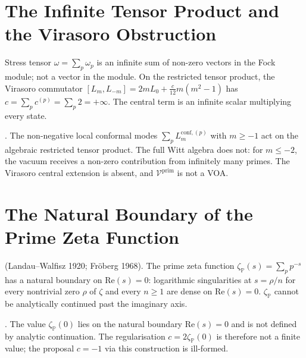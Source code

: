 \section{The Infinite Tensor Product and the Virasoro Obstruction}
\label{v4-arith:pol:infinite-tensor-not-VOA}

\begin{observation}
\label{v4-arith:obs:infinite-tensor-fails}
Stress tensor \(\omega=\sum_{p}\omega_{p}\) is an infinite sum of
non-zero vectors in the Fock module; not a vector in the module.
On the restricted tensor product, the Virasoro commutator
\([L_{m},L_{-m}]=2m L_{0}+\tfrac{c}{12}m(m^{2}-1)\) has
\(c=\sum_{p}c^{(p)}=\sum_{p}2=+\infty\). The central term is an
infinite scalar multiplying every state.
\end{observation}

\begin{corollary}
\label{v4-arith:cor:no-virasoro}
\ClaimStatusProvedHere. The non-negative local conformal modes
\(\sum_{p}L_{m}^{\mathrm{conf},(p)}\) with \(m\geq -1\) act on the
algebraic restricted tensor product. The full Witt algebra does not:
for \(m\leq -2\), the vacuum receives a non-zero contribution from
infinitely many primes. The Virasoro central extension is absent, and
\(\mathcal{V}^{\mathrm{prim}}\) is not a VOA.
\end{corollary}

\section{The Natural Boundary of the Prime Zeta Function}
\label{v4-arith:pol:prime-zeta-obstruction}

\begin{theorem}
\label{v4-arith:thm:prime-zeta-natural-boundary}
\ClaimStatusProvedElsewhere (Landau--Walfisz 1920; Fr\"oberg 1968).
The prime zeta function \(\zeta_{\mathbb{P}}(s)=\sum_{p}p^{-s}\) has
a natural boundary on \(\mathrm{Re}(s)=0\): logarithmic singularities
at \(s=\rho/n\) for every nontrivial zero \(\rho\) of \(\zeta\) and every
\(n\geq 1\) are dense on \(\mathrm{Re}(s)=0\).
\(\zeta_{\mathbb{P}}\) cannot be analytically continued past the
imaginary axis.
\end{theorem}

\begin{corollary}
\label{v4-arith:cor:zeta-P-0-undefined}
\ClaimStatusProvedHere. The value \(\zeta_{\mathbb{P}}(0)\) lies on
the natural boundary \(\mathrm{Re}(s)=0\) and is not defined by
analytic continuation. The regularisation \(c=2\zeta_{\mathbb{P}}(0)\)
is therefore not a finite value; the proposal \(c=-1\) via this construction
is ill-formed.
\end{corollary}

